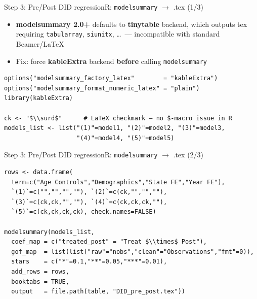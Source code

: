 \documentclass[dvipsnames,hyperref={pdfpagelabels=false}]{beamer}
\begin{document}
\begin{frame}[fragile]{Step 3: Pre/Post DID regression}{R: \texttt{modelsummary} $\to$ .tex (1/3)}
\begin{itemize}
    \item \textbf{modelsummary 2.0+} defaults to \textbf{tinytable} backend, which outputs
          tex requiring \texttt{tabularray}, \texttt{siunitx}, \ldots\
          --- incompatible with standard Beamer/\LaTeX
    \vspace{0.15cm}
    \item Fix: force \textbf{kableExtra} backend \textbf{before} calling \texttt{modelsummary}
\end{itemize}
\begin{lstlisting}
options("modelsummary_factory_latex"        = "kableExtra")
options("modelsummary_format_numeric_latex" = "plain")
library(kableExtra)

ck <- "$\\surd$"      # LaTeX checkmark — no $-macro issue in R
models_list <- list("(1)"=model1, "(2)"=model2, "(3)"=model3,
                    "(4)"=model4, "(5)"=model5)
\end{lstlisting}
\end{frame}

\begin{frame}[fragile]{Step 3: Pre/Post DID regression}{R: \texttt{modelsummary} $\to$ .tex (2/3)}
\begin{lstlisting}
rows <- data.frame(
  term=c("Age Controls","Demographics","State FE","Year FE"),
  `(1)`=c("","","",""), `(2)`=c(ck,"","",""),
  `(3)`=c(ck,ck,"",""), `(4)`=c(ck,ck,ck,""),
  `(5)`=c(ck,ck,ck,ck), check.names=FALSE)

modelsummary(models_list,
  coef_map = c("treated_post" = "Treat $\\times$ Post"),
  gof_map  = list(list("raw"="nobs","clean"="Observations","fmt"=0)),
  stars    = c("*"=0.1,"**"=0.05,"***"=0.01),
  add_rows = rows,
  booktabs = TRUE,
  output   = file.path(table, "DID_pre_post.tex"))
\end{lstlisting}
\end{frame}
\end{document}
